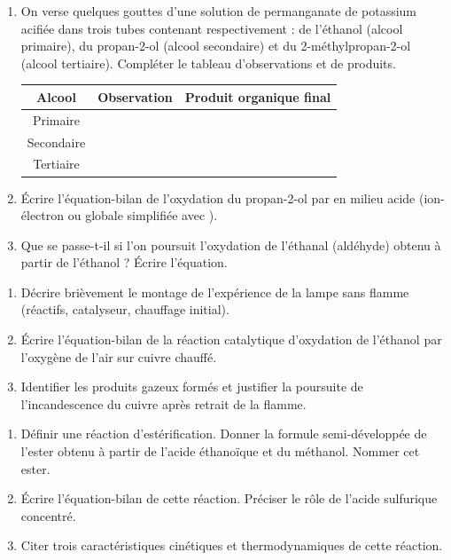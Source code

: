 \documentclass[11pt]{article}
\begin{document}
\begin{exercice}
\begin{enumerate}
    \item On verse quelques gouttes d'une solution de permanganate de potassium  acifiée dans trois tubes contenant respectivement : de l'éthanol (alcool primaire), du propan-2-ol (alcool secondaire) et du 2-méthylpropan-2-ol (alcool tertiaire). Compléter le tableau d'observations et de produits.
    \begin{tabular}{|c|c|c|}
    \hline
    \textbf{Alcool} & \textbf{Observation} & \textbf{Produit organique final} \\
    \hline
    Primaire & & \\
    \hline
    Secondaire & & \\
    \hline
    Tertiaire & & \\
    \hline
    \end{tabular}
    \item Écrire l'équation-bilan de l'oxydation du propan-2-ol par  en milieu acide (ion-électron ou globale simplifiée avec \ce{[O]}).
    \item Que se passe-t-il si l'on poursuit l'oxydation de l'éthanal (aldéhyde) obtenu à partir de l'éthanol ? Écrire l'équation.
\end{enumerate}
\end{exercice}

\begin{exercice}
\begin{enumerate}
    \item Décrire brièvement le montage de l'expérience de la lampe sans flamme (réactifs, catalyseur, chauffage initial).
    \item Écrire l'équation-bilan de la réaction catalytique d'oxydation de l'éthanol par l'oxygène de l'air sur cuivre chauffé.
    \item Identifier les produits gazeux formés et justifier la poursuite de l'incandescence du cuivre après retrait de la flamme.
\end{enumerate}
\end{exercice}

\begin{exercice}[Estérification]
\begin{enumerate}
    \item Définir une réaction d'estérification. Donner la formule semi-développée de l'ester obtenu à partir de l'acide éthanoïque et du méthanol. Nommer cet ester.
    \item Écrire l'équation-bilan de cette réaction. Préciser le rôle de l'acide sulfurique concentré.
    \item Citer trois caractéristiques cinétiques et thermodynamiques de cette réaction.
\end{enumerate}
\end{exercice}
\end{document}
